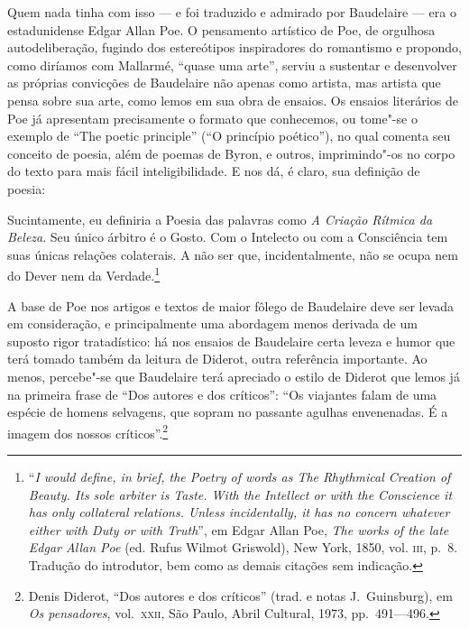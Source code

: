 Quem nada tinha com isso --- e foi traduzido e admirado por Baudelaire
--- era o estadunidense Edgar Allan Poe. 
O pensamento artístico de Poe, de orgulhosa autodeliberação,
fugindo dos estereótipos inspiradores do romantismo e propondo, como
diríamos com Mallarmé, “quase uma arte”, serviu a sustentar e
desenvolver as próprias convicções de Baudelaire não apenas como
artista, mas artista que pensa sobre sua arte, como lemos em sua obra
de ensaios. Os ensaios literários de Poe já apresentam precisamente o
formato que conhecemos, ou tome"-se o exemplo de “The poetic principle”
(``O princípio poético''), no qual comenta seu conceito de poesia, além de
poemas de Byron,  e outros, imprimindo"-os no corpo do texto para
mais fácil inteligibilidade. E nos dá, é claro, sua definição de
poesia:

\begin{hedraquote}
Sucintamente, eu definiria a Poesia das palavras como
\textit{A Criação Rítmica da Beleza}. Seu único árbitro é o Gosto. Com
o Intelecto ou com a Consciência tem suas únicas relações colaterais. A
não ser que, incidentalmente, não se ocupa nem do Dever nem da Verdade.\footnote{ ``\textit{I 
would define, in brief, the Poetry of words as \textit{The Rhythmical
Creation of Beauty.} Its sole arbiter is Taste. With the Intellect or
with the Conscience it has only collateral relations. Unless
incidentally, it has no concern whatever either with Duty or with
Truth}'',
em Edgar Allan Poe, \textit{The works of the late Edgar
Allan Poe} (ed. Rufus Wilmot Griswold), New York, 1850,  vol. \textsc{iii}, p.~8. 
Tradução do introdutor, bem como as demais citações sem indicação.}
\end{hedraquote}

A base de Poe nos artigos e textos de maior fôlego de Baudelaire deve ser levada em consideração, e principalmente uma abordagem menos
derivada de um suposto rigor tratadístico: há nos ensaios de Baudelaire
certa leveza e humor que terá tomado também da leitura de Diderot,
outra referência importante. Ao menos, percebe"-se que Baudelaire terá
apreciado o estilo de Diderot que lemos já na primeira frase de “Dos
autores e dos críticos”: “Os viajantes falam de uma espécie de homens
selvagens, que sopram no passante agulhas envenenadas. É a imagem dos
nossos críticos”.\footnote{ Denis Diderot, “Dos autores e dos críticos”
(trad. e notas J.~Guinsburg), em \textit{Os
pensadores}, vol.~\textsc{xxii}, São Paulo, Abril Cultural, 1973, pp.~491---496.}

